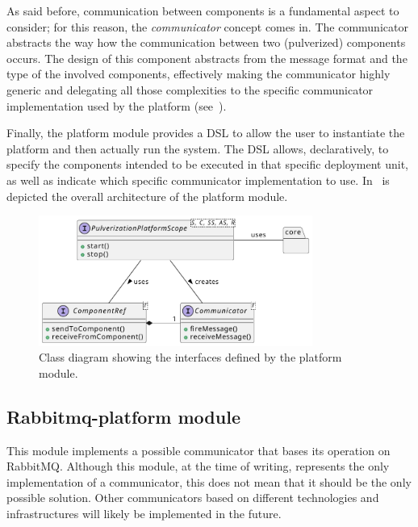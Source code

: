 As said before, communication between components is a fundamental aspect to consider; for this reason, the \emph{communicator} concept comes in.
The communicator abstracts the way how the communication between two (pulverized) components occurs.
The design of this component abstracts from the message format and the type of the involved components, effectively making the communicator highly
generic and delegating all those complexities to the specific communicator implementation used by the platform
(see~).

Finally, the platform module provides a DSL to allow the user to instantiate the platform and then actually run the system.
The DSL allows, declaratively, to specify the components intended to be executed in that specific deployment unit, as well as indicate which
specific communicator implementation to use. In~ is depicted the overall architecture of the platform module.

\begin{figure}[ht]
	\centering
	\includegraphics[width=0.8\textwidth]{figures/platform-design-interfaces.pdf}
	\caption{Class diagram showing the interfaces defined by the platform module.}
	\label{fig:platform-module-architecture}
\end{figure}

\subsection{Rabbitmq-platform module}
\label{sec:rabbitmq-platform-module}

This module implements a possible communicator that bases its operation on RabbitMQ. Although this module, at the time of writing, represents
the only implementation of a communicator, this does not mean that it should be the only possible solution.
Other communicators based on different technologies and infrastructures will likely be implemented in the future.

